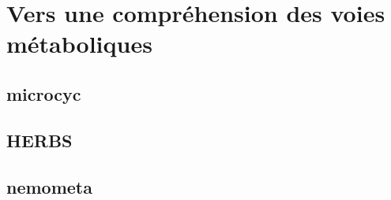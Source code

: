 
\chapter{Vers une compréhension des voies métaboliques}
\section{microcyc}
\section{HERBS}
\section{nemometa}
